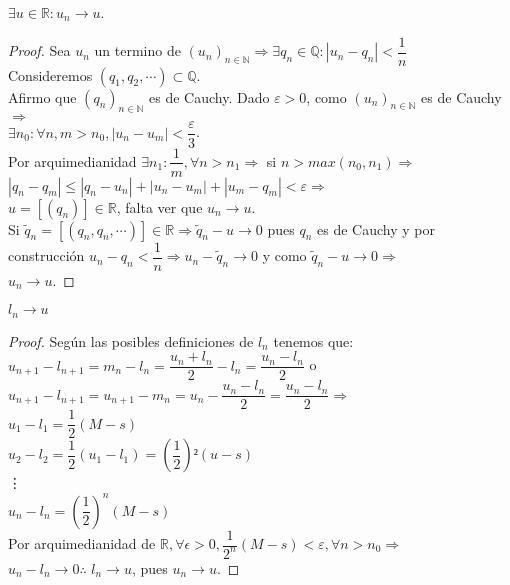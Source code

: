 \begin{lemma}
  $\exists u \in \mathbb{R} : u_n \to u$.
  \begin{proof}
    Sea $u_n$ un termino de $(u_n)_{n \in \mathbb{N}} \Rightarrow \exists q_n \in \mathbb{Q} : |u_n - q_n| < \dfrac{1}{n}$ \\
    Consideremos $(q_1, q_2, \cdots) \subset \mathbb{Q}$. \\
    Afirmo que $(q_n)_{n \in \mathbb{N}}$ es de Cauchy. Dado $\varepsilon > 0$, como $(u_n)_{n \in \mathbb{N}}$ es de Cauchy $\Rightarrow$ \\
    $\exists n_0 : \forall n, m > n_0, |u_n - u_m| < \dfrac{\varepsilon}{3}$. \\
    Por arquimedianidad $\exists n_1 : \dfrac{1}{m}, \forall n > n_1 \Rightarrow$ si $n > max(n_0, n_1) \Rightarrow$ \\
    $|q_n - q_m| \leq |q_n - u_n| + |u_n - u_m| + |u_m - q_m| < \varepsilon \Rightarrow$ \\
    $u = [(q_n)] \in \mathbb{R}$, falta ver que $u_n \to u$. \\
    Si $\tilde{q}_n = [(q_n, q_n, \cdots)] \in \mathbb{R} \Rightarrow \tilde{q}_n - u \to 0$ pues $q_n$ es de Cauchy y por construcción $u_n - q_n < \dfrac{1}{n} \Rightarrow u_n - \tilde{q}_n \to 0$ y como $\tilde{q}_n - u \to 0 \Rightarrow$ \\
    $u_n \to u$.
  \end{proof}
\end{lemma}

\begin{lemma}
  $l_n \to u$
  \begin{proof}
    Según las posibles definiciones de $l_n$ tenemos que: \\
    $u_{n+1} - l_{n+1} = m_n - l_n = \dfrac{u_n+l_n}{2} - l_n = \dfrac{u_n-l_n}{2}$ o \\
    $u_{n+1} - l_{n+1} = u_{n+1} - m_n = u_n - \dfrac{u_n - l_n}{2} = \dfrac{u_n - l_n}{2} \Rightarrow$ \\
    $u_1 - l_1 = \dfrac{1}{2} (M-s)$ \\
    $u_2 - l_2 = \dfrac{1}{2} (u_1 - l_1) = (\dfrac{1}{2})² (u - s)$ \\
    \vdots \\
    $u_n - l_n = (\dfrac{1}{2})^n (M - s)$ \\
    
    Por arquimedianidad de $\mathbb{R}, \forall \epsilon > 0, \dfrac{1}{2^n} (M - s) < \varepsilon, \forall n > n_0 \Rightarrow$ \\
    $u_n - l_n \to 0 \therefore$ $l_n \to u$, pues $u_n \to u$.
  \end{proof}
\end{lemma}

